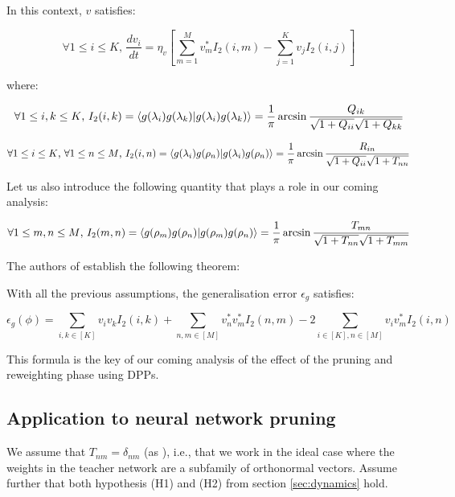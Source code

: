In this context, $v$ satisfies:

\begin{equation} \label{eqn:evov}
\forall 1 \leq i \leq K \text{, } \dfrac{dv_i}{dt} = \eta_v[\sum \limits_{m=1}^M v_m^* I_2(i,m) - \sum \limits_{j =1}^K v_j I_2(i,j)] 
\end{equation}

where:

$$\forall 1 \leq i,k \leq K \text{, } I_2(i,k) = \braket{g(\lambda_i) g(\lambda_k)} =  \dfrac{1}{\pi} \arcsin{\dfrac{Q_{ik}}{\sqrt{1+Q_{ii}} \sqrt{1+Q_{kk}}}}$$

$$\forall 1 \leq i \leq K \text{, } \forall 1 \leq n \leq M \text{, } I_2(i,n) = \braket{g(\lambda_i)g(\rho_n)} = \dfrac{1}{\pi} \arcsin{\dfrac{R_{in}}{\sqrt{1+Q_{ii}} \sqrt{1+T_{nn}}}}$$

Let us also introduce the following quantity that plays a role in our coming analysis:

$$\forall 1 \leq m,n \leq M \text{, } I_2(m,n) = \braket{g(\rho_m)g(\rho_n)} = \dfrac{1}{\pi} \arcsin{\dfrac{T_{mn}}{\sqrt{1+T_{nn}} \sqrt{1+T_{mm}}}}$$

The authors of \cite{goldt_dynamics_2020} establish the following theorem:

\begin{theorem}
    With all the previous assumptions, the generalisation error $\epsilon_{g}$ satisfies: 

    \begin{equation} \label{eqn:generror}
 \epsilon_g(\phi) = \sum \limits_{i,k \in [K]} v_i v_k I_2(i,k) + \sum \limits_{n,m \in [M]} v_n^* v_m^* I_2(n,m) - 2 \sum \limits_{i \in [K], n \in [M]} v_i v_m^* I_2(i,n)
    \end{equation}
\end{theorem}

This formula is the key of our coming analysis of the effect of the pruning and reweighting phase using DPPs. 



\subsection{Application to neural network pruning}
We assume that $T_{nm} = \delta_{nm}$ (as \cite{acharyya_statistical_2021}), i.e., that we work in the ideal case where the weights in the teacher network are a subfamily of orthonormal vectors. Assume further that both hypothesis (H1) and (H2) from section \ref{sec:dynamics} hold. 

